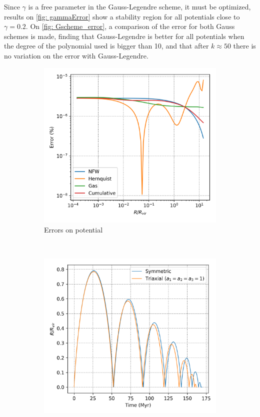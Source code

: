 		Since $\gamma$ is a free parameter in the Gauss-Legendre scheme, it must be optimized, results on \autoref{fig: gammaError} show a stability region for all potentials close to $\gamma = 0.2$. On \autoref{fig: Gscheme_error}, a comparison of the error for both Gauss schemes is made, finding that Gauss-Legendre is better for all potentials when the degree of the polynomial used is bigger than 10, and that after $k \approx 50$ there is no variation on the error with Gauss-Legendre.
		\begin{figure}[!h]
			\centering
			\begin{subfigure}[t]{0.4\textwidth}
				\includegraphics[width = \textwidth]{"../Files/Week 8/error"}
				\caption{Errors on potential}
				\label{fig: potentialErrors}
			\end{subfigure}
			~ 
			\begin{subfigure}[t]{0.4\textwidth}
				\includegraphics[width = \textwidth]{"../Files/Week 7/symmetric_triaxial"}

\end{subfigure}
\end{figure}
